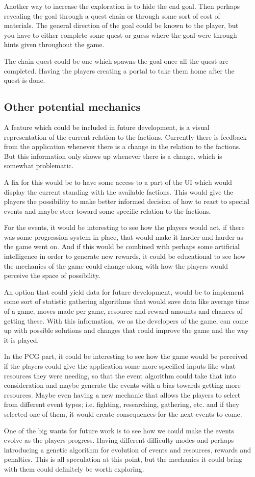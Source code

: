 Another way to increase the exploration is to hide the end goal. Then perhaps revealing the goal through a quest chain or through some sort of cost of materials. The general direction of the goal could be known to the player, but you have to either complete some quest or guess where the goal were through hints given throughout the game.

The chain quest could be one which spawns the goal once all the quest are completed. Having the players creating a portal to take them home after the quest is done.
\subsection{Other potential mechanics}
A feature which could be included in future development, is a visual representation of the current relation to the factions.
Currently there is feedback from the application whenever there is a change in the relation to the factions. But this information only shows up whenever there is a change, which is somewhat problematic. 

A fix for this would be to have some access to a part of the UI which would display the current standing with the available factions. This would give the players the possibility to make better informed decision of how to react to special events and maybe steer toward some specific relation to the factions.

For the events, it would be interesting to see how the players would act, if there was some progression system in place, that would make it harder and harder as the game went on. And if this would be combined with perhaps some artificial intelligence in order to generate new rewards, it could be educational to see how the mechanics of the game could change along with how the players would perceive the space of possibility.

An option that could yield data for future development, would be to implement some sort of statistic gathering algorithms that would save data like average time of a game, moves made per game, resource and reward amounts and chances of getting these. With this information, we as the developers of the game, can come up with possible solutions and changes that could improve the game and the way it is played.

In the PCG part, it could be interesting to see how the game would be perceived if the players could give the application some more specified inputs like what resources they were needing, so that the event algorithm could take that into consideration and maybe generate the events with a bias towards getting more resources. Maybe even having a new mechanic that allows the players to select from different event types; i.e. fighting, researching, gathering, etc. and if they selected one of them, it would create consequences for the next events to come.

One of the big wants for future work is to see how we could make the events evolve as the players progress. Having different difficulty modes and perhaps introducing a genetic algorithm for evolution of events and resources, rewards and penalties. This is all speculation at this point, but the mechanics it could bring with them could definitely be worth exploring.
